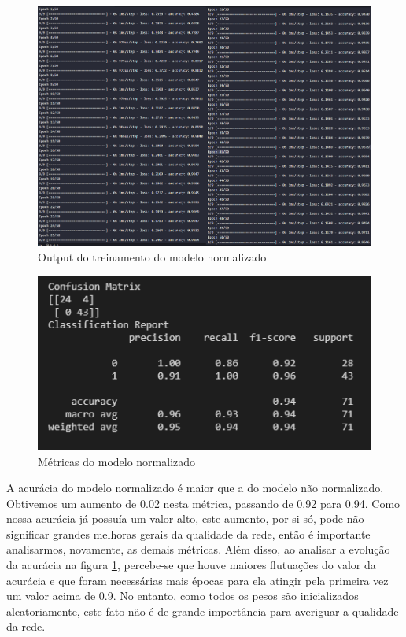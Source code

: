 \documentclass[12pt]{article}
\begin{document}
\begin{figure}[H]
	\centering
	\includegraphics[width=1.1\linewidth]{Imagens/Fit_Normalizada}
	\caption{Output do treinamento do modelo normalizado}
	\label{fig:fitnormalizada}
\end{figure}
\begin{figure}[H]
	\centering
	\includegraphics[width=0.7\linewidth]{Imagens/resultadoNormalizada}
	\caption{Métricas do modelo normalizado}
	\label{fig:resultadonormalizada}
\end{figure}

A acurácia do modelo normalizado é maior que a do modelo não normalizado. Obtivemos um aumento de 0.02 nesta métrica, passando de 0.92 para 0.94. Como nossa acurácia já possuía um valor alto, este aumento, por si só, pode não significar grandes melhoras gerais da qualidade da rede, então é importante analisarmos, novamente, as demais métricas. Além disso, ao analisar a evolução da acurácia na figura \ref{fig:fitnormalizada}, percebe-se que houve maiores flutuações do valor da acurácia e que foram necessárias mais épocas para ela atingir pela primeira vez um valor acima de 0.9. No entanto, como todos os pesos são inicializados aleatoriamente, este fato não é de grande importância para averiguar a qualidade da rede.
\end{document}
